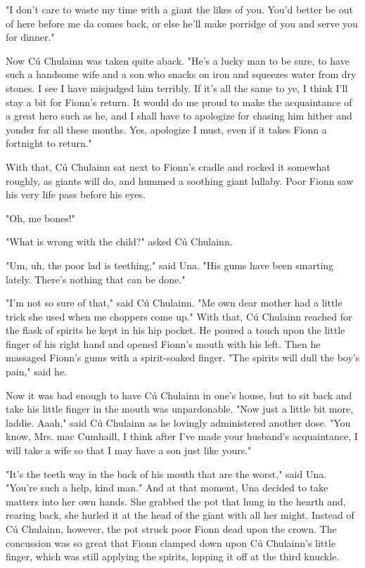 "I don't care to waste my time with a giant the likes of you. You'd better be out of here before me da comes back, or else he'll make porridge of you and serve you for dinner."

Now Cú Chulainn was taken quite aback. "He's a lucky man to be sure, to have such a handsome wife and a son who snacks on iron and squeezes water from dry stones. I see I have misjudged him terribly. If it's all the same to ye, I think I'll stay a bit for Fionn's return. It would do me proud to make the acquaintance of a great hero such as he, and I shall have to apologize for chasing him hither and yonder for all these months. Yes, apologize I must, even if it takes Fionn a fortnight to return."

With that, Cú Chulainn sat next to Fionn's cradle and rocked it somewhat roughly, as giants will do, and hummed a soothing giant lullaby. Poor Fionn saw his very life pass before his eyes.

"Oh, me bones!"

"What is wrong with the child?" asked Cú Chulainn.

"Um, uh, the poor lad is teething," said Una. "His gums have been smarting lately. There's nothing that can be done."

"I'm not so sure of that," said Cú Chulainn. "Me own dear mother had a little trick she used when me choppers come up." With that, Cú Chulainn reached for the flask of spirits he kept in his hip pocket. He poured a touch upon the little finger of his right hand and opened Fionn's mouth with his left. Then he massaged Fionn's gums with a spirit-soaked finger. "The spirits will dull the boy's pain," said he.

Now it was bad enough to have Cú Chulainn in one's house, but to sit back and take his little finger in the mouth was unpardonable. "Now just a little bit more, laddie. Aaah," said Cú Chulainn as he lovingly administered another dose. "You know, Mrs. mac Cumhaill, I think after I've made your husband's acquaintance, I will take a wife so that I may have a son just like yours."

"It's the teeth way in the back of his mouth that are the worst," said Una. "You're such a help, kind man." And at that moment, Una decided to take matters into her own hands. She grabbed the pot that hung in the hearth and, rearing back, she hurled it at the head of the giant with all her might. Instead of Cú Chulainn, however, the pot struck poor Fionn dead upon the crown. The concussion was so great that Fionn clamped down upon Cú Chulainn's little finger, which was still applying the spirits, lopping it off at the third knuckle.

